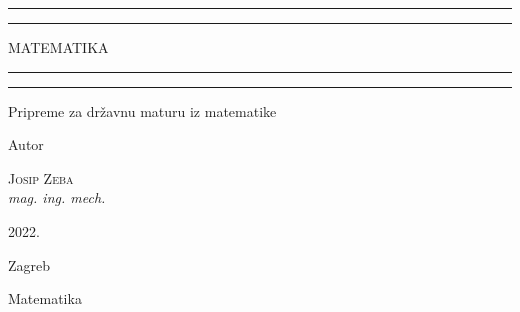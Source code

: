 \documentclass[a4paper,12pt,oneside,draft]{book}
\begin{document}
\begin{titlepage}

	\centering
	\scshape
	\vspace*{\baselineskip}


	\rule{\textwidth}{1.6pt}\vspace*{-\baselineskip}\vspace*{2pt}
	\rule{\textwidth}{0.4pt}

	\vspace{0.75\baselineskip}

	{\LARGE MATEMATIKA\\}

	\vspace{0.75\baselineskip}

	\rule{\textwidth}{0.4pt}\vspace*{-\baselineskip}\vspace{3.2pt}
	\rule{\textwidth}{1.6pt}

	\vspace{2\baselineskip}


	Pripreme za dr\v zavnu maturu iz matematike

	\vspace*{3\baselineskip}


	Autor

	\vspace{0.5\baselineskip}
	{\scshape\Large Josip Zeba\\}
	\vspace{0.5\baselineskip}
	\textit{mag. ing. mech.}

	\vfill


	\vspace{0.3\baselineskip}
	2022.

	{\large Zagreb}

\end{titlepage}

    Matematika

    
    
\end{document}
